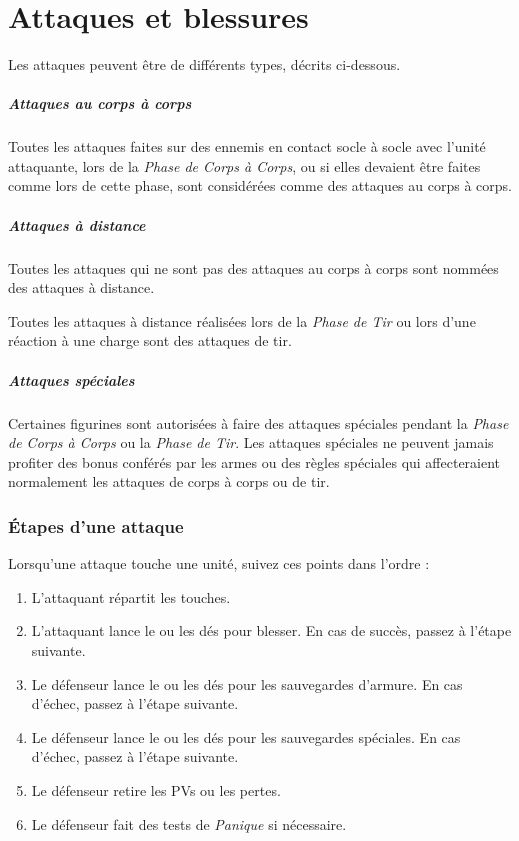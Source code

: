 
\part{Attaques et blessures}
\label{attaque_et_blessure}

Les attaques peuvent être de différents types, décrits ci-dessous.

\subsubsection*{Attaques au corps à corps}

Toutes les attaques faites sur des ennemis en contact socle à socle avec l'unité attaquante, lors de la \emph{Phase de Corps à Corps}, ou si elles devaient être faites comme lors de cette phase, sont considérées comme des attaques au corps à corps.

\subsubsection*{Attaques à distance}

Toutes les attaques qui ne sont pas des attaques au corps à corps sont nommées des attaques à distance.

Toutes les attaques à distance réalisées lors de la \emph{Phase de Tir} ou lors d'une réaction à une charge sont des attaques de tir.

\subsubsection*{Attaques spéciales}

Certaines figurines sont autorisées à faire des attaques spéciales pendant la \emph{Phase de Corps à Corps} ou la \emph{Phase de Tir}. Les attaques spéciales ne peuvent jamais profiter des bonus conférés par les armes ou des règles spéciales qui affecteraient normalement les attaques de corps à corps ou de tir.

\section{Étapes d'une attaque}

Lorsqu'une attaque touche une unité, suivez ces points dans l'ordre :
\begin{enumerate} 
\item L'attaquant répartit les touches.
\item L'attaquant lance le ou les dés pour blesser. En cas de succès, passez à l'étape suivante. 
\item Le défenseur lance le ou les dés pour les sauvegardes d'armure. En cas d'échec, passez à l'étape suivante.
\item Le défenseur lance le ou les dés pour les sauvegardes spéciales. En cas d'échec, passez à l'étape suivante.
\item Le défenseur retire les PVs ou les pertes.
\item Le défenseur fait des tests de \emph{Panique} si nécessaire.
\end{enumerate}

